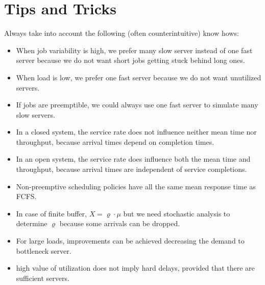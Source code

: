 \section{Tips and Tricks}
\label{sec:tips-and-tricks}

Always take into account the following (often counterintuitive) know hows:
\begin{itemize}
	\item When job variability is high, we prefer many slow server instead of one fast server because we do not want short jobs getting stuck behind long ones.
	
	\item When load is low, we prefer one fast server because we do not want unutilized servers.
	
	\item If jobs are preemptible, we could always use one fast server to simulate many slow servers.
	
	\item In a closed system, the service rate does not influence neither mean time nor throughput, because arrival times depend on completion times.
	
	\item In an open system, the service rate does influence both the mean time and throughput, because arrival times are independent of service completions.
	
	\item Non-preemptive scheduling policies have all the same mean response time as FCFS.
	
	\item In case of finite buffer, $X=\varrho \cdot \mu$ but we need stochastic analysis to determine $\varrho$ because some arrivals can be dropped.
	
	\item For large loads, improvements can be achieved decreasing the demand to bottleneck server.
	
	\item high value of utilization does not imply hard delays, provided that there are sufficient servers.
\end{itemize}